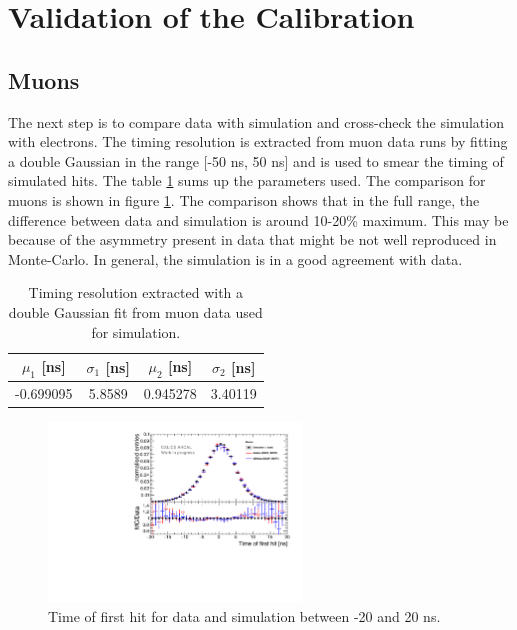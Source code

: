 \section{Validation of the Calibration}

\subsection{Muons}

The next step is to compare data with simulation and cross-check the simulation with electrons. The timing resolution is extracted from muon data runs by fitting a double Gaussian in the range [-50 ns, 50 ns] and is used to smear the timing of simulated hits. The table \ref{table:time_res_sim} sums up the parameters used. The comparison for muons is shown in figure \ref{fig:sim_data_muon}. The comparison shows that in the full range, the difference between data and simulation is around 10-20\% maximum. This may be because of the asymmetry present in data that might be not well reproduced in Monte-Carlo. In general, the simulation is in a good agreement with data.

\begin{table}[htbp]
\centering
  \begin{tabular}{@{} cccc @{}}
    \hline
    $\mu_{1}$ [ns] & $\sigma_{1}$ [ns] & $\mu_{2}$ [ns] & $\sigma_{2}$ [ns] \\
    \hline
    -0.699095 & 5.8589 & 0.945278 & 3.40119 \\
    \hline
  \end{tabular}
  \caption[Timing resolution extracted with a double Gaussian fit from muon data used for simulation.]{Timing resolution extracted with a double Gaussian fit from muon data used for simulation.\footnotemark[1]}
  \label{table:time_res_sim}
\end{table}

\begin{figure}[htbp]
	\centering
	\includegraphics[width=0.6\textwidth]{fig/Muons/Comparison_MokkaDD4hepData_Muons.pdf}
	\caption{Time of first hit for data and simulation between -20 and 20 ns.}
	\label{fig:sim_data_muon}
\end{figure}


